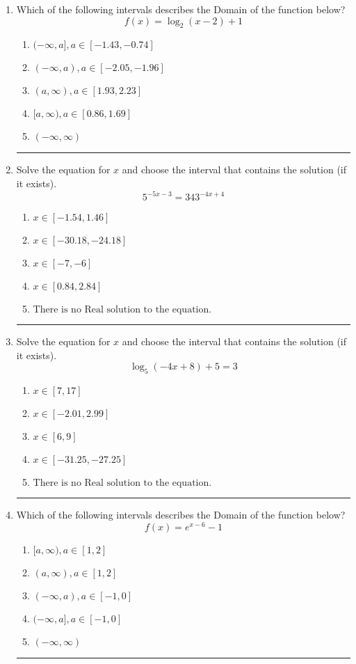\documentclass[14pt]{extbook}
\newcommand{\litem}[1]{\item#1\hspace*{-1cm}\rule{\textwidth}{0.4pt}}
\begin{document}
\begin{enumerate}
\litem{
Which of the following intervals describes the Domain of the function below?\[ f(x) = \log_2{(x-2)}+1 \]\begin{enumerate}[label=\Alph*.]
\item \( (-\infty, a], a \in [-1.43, -0.74] \)
\item \( (-\infty, a), a \in [-2.05, -1.96] \)
\item \( (a, \infty), a \in [1.93, 2.23] \)
\item \( [a, \infty), a \in [0.86, 1.69] \)
\item \( (-\infty, \infty) \)

\end{enumerate} }
\litem{
Solve the equation for $x$ and choose the interval that contains the solution (if it exists).\[ 5^{-5x-3} = 343^{-4x+4} \]\begin{enumerate}[label=\Alph*.]
\item \( x \in [-1.54, 1.46] \)
\item \( x \in [-30.18, -24.18] \)
\item \( x \in [-7, -6] \)
\item \( x \in [0.84, 2.84] \)
\item \( \text{There is no Real solution to the equation.} \)

\end{enumerate} }
\litem{
Solve the equation for $x$ and choose the interval that contains the solution (if it exists).\[ \log_{5}{(-4x+8)}+5 = 3 \]\begin{enumerate}[label=\Alph*.]
\item \( x \in [7, 17] \)
\item \( x \in [-2.01, 2.99] \)
\item \( x \in [6, 9] \)
\item \( x \in [-31.25, -27.25] \)
\item \( \text{There is no Real solution to the equation.} \)

\end{enumerate} }
\litem{
Which of the following intervals describes the Domain of the function below?\[ f(x) = e^{x-6}-1 \]\begin{enumerate}[label=\Alph*.]
\item \( [a, \infty), a \in [1, 2] \)
\item \( (a, \infty), a \in [1, 2] \)
\item \( (-\infty, a), a \in [-1, 0] \)
\item \( (-\infty, a], a \in [-1, 0] \)
\item \( (-\infty, \infty) \)


\end{enumerate}}
\end{enumerate}
\end{document}
